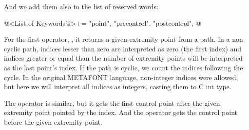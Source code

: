And we add them also to the list of reserved words:

\iniciocodigo
@<List of Keywords@>+=
"point", "precontrol", "postcontrol",
@
\fimcodigo

For the first operator, , it returns a given
extremity point from a path. In a non-cyclic path, indices lesser than
zero are interpreted as zero (the first index) and indices greater or
equal than the number of extremity points will be interpreted as the
last point's index. If the path is cyclic, we count the indices
following the cycle. In the original METAFONT language, non-integer
indices were allowed, but here we will interpret all indices as
integers, casting them to C int type.

The operator  is similar, but it gets the
first control point after the given extremity point pointed by the
index. And the operator  gets the control point
before the given extremity point.

